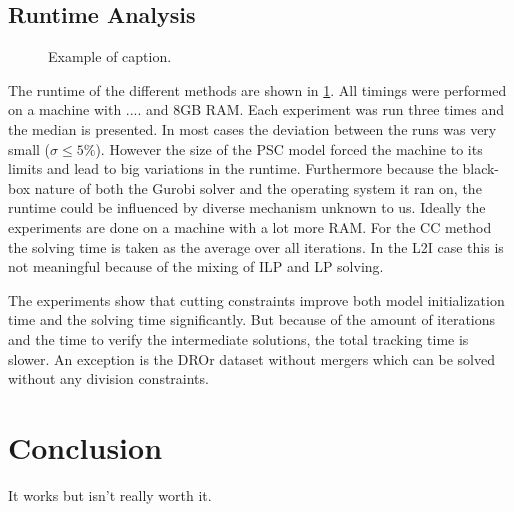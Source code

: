 \documentclass[10pt,twocolumn,letterpaper]{article}
\begin{document}
\subsection{Runtime Analysis}

\begin{figure}[t]
  \begin{center}
  \fbox{\rule{0pt}{2in} \rule{0.9\linewidth}{0pt}}
  \end{center}
   \caption{Example of caption.}
  \label{fig:runtime}
\end{figure}

The runtime of the different methods are shown in \cref{fig:runtime}. All timings were performed on a machine with .... and 8GB RAM. Each experiment was run three times and the median is presented. In most cases the deviation between the runs was very small ($\sigma \leq 5\%$). However the size of the PSC model forced the machine to its limits and lead to big variations in the runtime. Furthermore because the black-box nature of both the Gurobi solver and the operating system it ran on, the runtime could be influenced by diverse mechanism unknown to us. Ideally the experiments are done on a machine with a lot more RAM. For the CC method the solving time is taken as the average over all iterations. In the L2I case this is not meaningful because of the mixing of ILP and LP solving.

The experiments show that cutting constraints improve both model initialization time and the solving time significantly. But because of the amount of iterations and the time to verify the intermediate solutions, the total tracking time is slower. An exception is the DROr dataset without mergers which can be solved without any division constraints.



\section{Conclusion}

It works but isn't really worth it.


{\small


}
\end{document}
